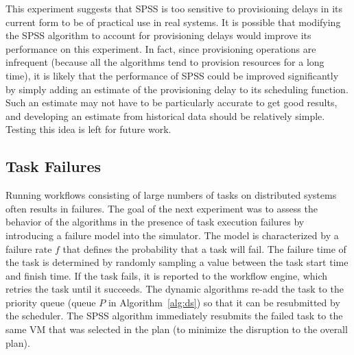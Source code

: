 \documentclass[preprint,5p]{elsarticle}
\begin{document}
This experiment suggests that SPSS is too sensitive to provisioning delays
in its current form to be of practical use in real systems. It is possible
that modifying the SPSS algorithm to account for provisioning delays would
improve its performance on this experiment. In fact, since provisioning
operations are infrequent (because all the algorithms tend to provision
resources for a long time), it is likely that the performance of SPSS could be
improved significantly by simply adding an estimate of the provisioning delay
to its scheduling function. Such an estimate may not have to be particularly
accurate to get good results, and developing an estimate from historical data
should be relatively simple. Testing this idea is left for future work.


\subsection{Task Failures}
\label{sec:failures}

Running workflows consisting of large numbers of tasks on distributed systems
often results in failures. The goal of the next experiment was to assess the
behavior of the algorithms in the presence of task execution failures by
introducing a failure model into the simulator. The model is characterized by
a failure rate $f$ that defines the probability that a task will fail. The
failure time of the task is determined by randomly sampling a value between
the task start time and finish time. If the task fails, it is reported to the
workflow engine, which retries the task until it succeeds. The dynamic
algorithms re-add the task to the priority queue (queue $P$ in
Algorithm~\ref{alg:ds}) so that it can be resubmitted by the scheduler. The
SPSS algorithm immediately  resubmits the failed task to the same VM that was
selected in the plan (to minimize the disruption to the overall plan).
\end{document}

